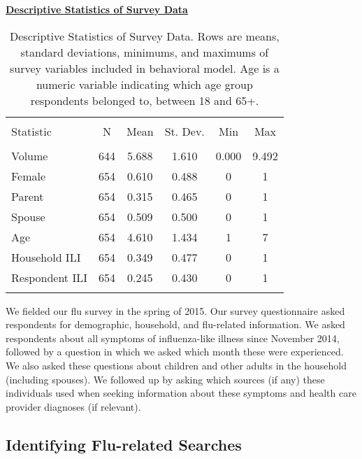 \documentclass[fleqn,10pt]{wlscirep}
\begin{document}
\begin{table}[!htbp] \centering 
\textbf{\underline{Descriptive Statistics of Survey Data}}\par\medskip
\begin{tabular}{@{\extracolsep{5pt}}lccccc} 
\\[-1.8ex]\hline 
\hline \\[-1.8ex] 
Statistic & \multicolumn{1}{c}{N} & \multicolumn{1}{c}{Mean} & \multicolumn{1}{c}{St. Dev.} & \multicolumn{1}{c}{Min} & \multicolumn{1}{c}{Max} \\ 
\hline \\[-1.8ex] 
Volume & 644 & 5.688 & 1.610 & 0.000 & 9.492 \\ 
Female & 654 & 0.610 & 0.488 & 0 & 1 \\ 
Parent & 654 & 0.315 & 0.465 & 0 & 1 \\ 
Spouse & 654 & 0.509 & 0.500 & 0 & 1 \\ 
Age & 654 & 4.610 & 1.434 & 1 & 7 \\ 
Household ILI & 654 & 0.349 & 0.477 & 0 & 1 \\ 
Respondent ILI & 654 & 0.245 & 0.430 & 0 & 1 \\ 
\hline \\[-1.8ex] 
\end{tabular} 
  \caption{Descriptive Statistics of Survey Data. Rows are means, standard deviations, minimums, and maximums of survey variables included in behavioral model. Age is a numeric variable indicating which age group respondents belonged to, between 18 and 65+.} 
\label{tab:descriptives}
\end{table} 

We fielded our flu survey in the spring of 2015. Our survey questionnaire asked respondents for demographic, household, and flu-related information. We asked respondents about all symptoms of influenza-like illness since November 2014, followed by a question in which we asked which month these were experienced. We also asked these questions about children and other adults in the household (including spouses). We followed up by asking which sources (if any) these individuals used when seeking information about these symptoms and health care provider diagnoses (if relevant).

\subsection*{Identifying Flu-related Searches}
\end{document}
